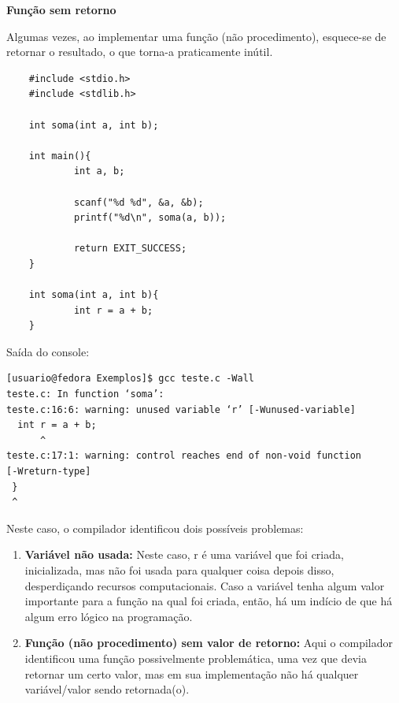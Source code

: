 \documentclass[12pt]{article}
\newcommand\tab[1][1cm]{\hspace*{#1}}
\begin{document}
\hspace{2cm}
\par\tab\textbf{Função sem retorno}

\par\tab Algumas vezes, ao implementar uma função (não procedimento), esquece-se de retornar o resultado, o que torna-a praticamente inútil.

\hspace{0.25cm}
\begin{lstlisting}
    #include <stdio.h>
    #include <stdlib.h>
    
    int soma(int a, int b);
    
    int main(){
            int a, b;
    
            scanf("%d %d", &a, &b);
            printf("%d\n", soma(a, b));
    
            return EXIT_SUCCESS;
    }
    
    int soma(int a, int b){
            int r = a + b;
    }
\end{lstlisting}

\par\tab Saída do console:

\hspace{0.25cm}
\begin{tcolorbox}[colback=black!5!white,colframe=black!75!white,title=Console: usuario@fedora:\~/Exemplos]
    \begin{verbatim}
[usuario@fedora Exemplos]$ gcc teste.c -Wall
teste.c: In function ‘soma’:
teste.c:16:6: warning: unused variable ‘r’ [-Wunused-variable]
  int r = a + b;
      ^
teste.c:17:1: warning: control reaches end of non-void function
[-Wreturn-type]
 }
 ^
    \end{verbatim}
\end{tcolorbox}

\par\tab Neste caso, o compilador identificou dois possíveis problemas:
\begin{enumerate}
    \item \textbf{Variável não usada:} Neste caso, r é uma variável que foi criada, inicializada, mas não foi usada para qualquer coisa depois disso, desperdiçando recursos computacionais. Caso a variável tenha algum valor importante para a função na qual foi criada, então, há um indício de que há algum erro lógico na programação.
    \item \textbf{Função (não procedimento) sem valor de retorno:} Aqui o compilador identificou uma função possivelmente problemática, uma vez que devia retornar um certo valor, mas em sua implementação não há qualquer variável/valor sendo retornada(o).
\end{enumerate}
\end{document}
